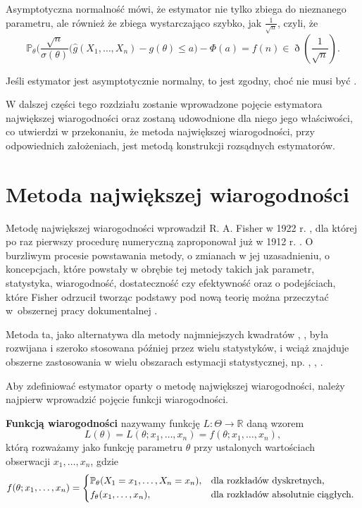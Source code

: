 Asymptotyczna normalność mówi, że estymator nie tylko zbiega do nieznanego parametru, ale również że zbiega wystarczająco szybko, jak $\frac{1}{\sqrt{n}}$, czyli, że 
$$\mathbb{P}_{\theta} \Big(\dfrac{\sqrt{n}}{\sigma(\theta)}(\hat{g}(X_1,\dots,X_n) -g(\theta) \leq a \Big) - \Phi(a) = f(n) \in \eth(\frac{1}{\sqrt{n}}) . $$ 

Jeśli estymator jest asymptotycznie normalny, to jest zgodny, choć nie musi
być \textit{}.

W dalszej części tego rozdziału zostanie wprowadzone pojęcie estymatora największej wiarogodności oraz zostaną udowodnione dla niego jego właściwości, co utwierdzi w przekonaniu, że metoda największej wiarogodności, przy odpowiednich założeniach, jest metodą konstrukcji rozsądnych estymatorów.

\newpage 

\section{Metoda największej wiarogodności}

Metodę największej wiarogodności wprowadził R. A. Fisher w 1922 r. \cite{fisher2}, dla której po raz pierwszy procedurę numeryczną zaproponował już w 1912 r. \cite{fisher1}. O burzliwym procesie powstawania metody, o zmianach w jej uzasadnieniu, o koncepcjach, które powstały w obrębie tej metody takich jak parametr, statystyka, wiarogodność, dostateczność czy efektywność oraz o podejściach, które Fisher odrzucił tworząc podstawy pod nową teorię można przeczytać w~obszernej pracy dokumentalnej \cite{aldrich1}. 

Metoda ta, jako alternatywa dla metody najmniejszych kwadratów \cite{legendre1}, \cite{gauss1}, była rozwijana i szeroko stosowana później przez wielu statystyków, i wciąż znajduje obszerne zastosowania w wielu obszarach estymacji statystycznej, np. \cite{hutch1}, \cite{kenward1}, \cite{millar1}.

Aby zdefiniować estymator oparty o metodę największej wiarogodności, należy najpierw wprowadzić pojęcie funkcji wiarogodności.

\begin{definition}
\textbf{Funkcją wiarogodności} nazywamy funkcję $L : \Theta \rightarrow \mathbb{R}$ daną wzorem $$ L(\theta) =L(\theta;x_1, \dots , x_n) = f(\theta; x_1, \dots , x_n),$$
którą rozważamy jako funkcję parametru $\theta$ przy ustalonych wartościach obserwacji $x_1, \dots , x_n$, gdzie $$ f(\theta; x_1, \dots , x_n) = \begin{dcases*}
 \mathbb{P}_{\theta}( X_1 = x_1, \dots , X_n = x_n), & dla rozkładów dyskretnych,  \\
 f_{\theta}(x_1, \dots , x_n), & dla rozkładów absolutnie ciągłych.
\end{dcases*}$$

\end{definition}

